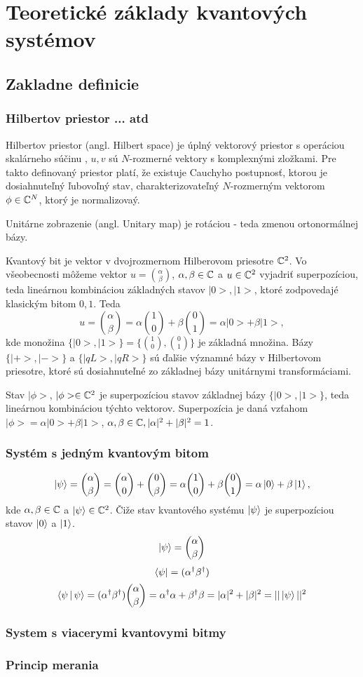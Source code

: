 
\chapter{Teoretické základy kvantových systémov}

\section{Zakladne definicie}

\subsection{Hilbertov priestor ... atd}
\label{hil_space}
Hilbertov priestor (angl. Hilbert space) je úplný vektorový priestor s operáciou skalárneho súčinu \(<u|v>\), \(u,v\) sú \(N\)-rozmerné vektory s komplexnými zložkami.
Pre takto definovaný priestor platí, že existuje Cauchyho postupnosť, ktorou je dosiahnuteľný ľubovoľný stav, charakterizovateľný \(N\)-rozmerným vektorom \(\phi \in \mathbb{C}^{N}\), ktorý je normalizovaý.

Unitárne zobrazenie (angl. Unitary map) je rotáciou - teda zmenou ortonormálnej bázy.

Kvantový bit je vektor v dvojrozmernom Hilberovom priesotre \(\mathbb{C}^{2}\).
Vo všeobecnosti môžeme vektor \(u = \binom{\alpha}{\beta}\), \(\alpha, \beta \in \mathbb{C}\) a \(u \in \mathbb{C}^{2}\) vyjadriť superpozíciou, teda lineárnou kombináciou základných stavov \(|0>, |1>\), ktoré zodpovedajé klasickým bitom \(0,1\).
Teda \[u = \binom{\alpha}{\beta} = \alpha \binom{1}{0} + \beta \binom{0}{1} = \alpha|0> + \beta|1>,\]
kde monožina \(\{|0>, |1>\} = \{\binom{1}{0}, \binom{0}{1}\}\) je základná množina.
Bázy \(\{|+>, |->\}\) a \(\{|qL>, |qR>\}\) sú ďalšie významné bázy v Hilbertovom priesotre, ktoré sú dosiahnuteľné zo základnej bázy unitárnymi transformáciami.

Stav \(|\phi>\), \(|\phi> \in \mathbb{C}^{2}\) je superpozíciou stavov základnej bázy \(\{|0>, |1>\}\), teda lineárnou kombináciou týchto vektorov.
Superpozícia je daná vzťahom \(|\phi> = \alpha|0> + \beta|1>\), \(\alpha, \beta \in \mathbb{C}, |\alpha|^{2} + |\beta|^{2} = 1\).

\subsection{Systém s jedným kvantovým bitom}
\[\Ket{\psi} = \binom{\alpha}{\beta} = \binom{\alpha}{0} + \binom{0}{\beta} = \alpha \binom{1}{0} + \beta \binom{0}{1} = \alpha \Ket{0} + \beta \Ket{1}, \]
kde \(\alpha, \beta \in \mathbb{C}\) a \(\Ket{\psi} \in \mathbb{C}^{2}\).
Čiže stav kvantového systému \(\Ket{\psi}\) je superpozíciou stavov \(\Ket{0}\) a \(\Ket{1}\).
\[\Ket{\psi} = \binom{\alpha}{\beta}\]
\[\Bra{\psi} = (\alpha^{\dag}\beta^{\dag})\]
\[\Braket{\psi|\psi} = (\alpha^{\dag}\beta^{\dag})\binom{\alpha}{\beta} = \alpha^{\dag}\alpha + \beta^{\dag}\beta = |\alpha|^{2} + |\beta|^{2} = ||\Ket{\psi}||^{2}\]


\subsection{System s viacerymi kvantovymi bitmy}
\subsection{Princip merania}
